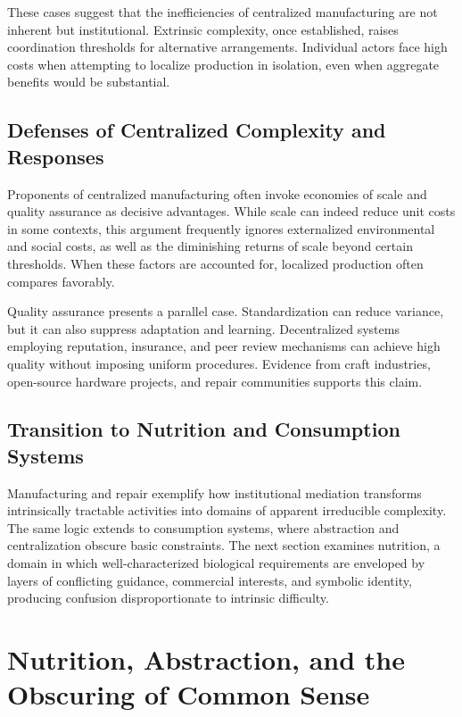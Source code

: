 \documentclass[11pt]{article}
\begin{document}
These cases suggest that the inefficiencies of centralized manufacturing are not inherent but institutional. Extrinsic complexity, once established, raises coordination thresholds for alternative arrangements. Individual actors face high costs when attempting to localize production in isolation, even when aggregate benefits would be substantial.

\subsection{Defenses of Centralized Complexity and Responses}

Proponents of centralized manufacturing often invoke economies of scale and quality assurance as decisive advantages. While scale can indeed reduce unit costs in some contexts, this argument frequently ignores externalized environmental and social costs, as well as the diminishing returns of scale beyond certain thresholds. When these factors are accounted for, localized production often compares favorably.

Quality assurance presents a parallel case. Standardization can reduce variance, but it can also suppress adaptation and learning. Decentralized systems employing reputation, insurance, and peer review mechanisms can achieve high quality without imposing uniform procedures. Evidence from craft industries, open-source hardware projects, and repair communities supports this claim.

\subsection{Transition to Nutrition and Consumption Systems}

Manufacturing and repair exemplify how institutional mediation transforms intrinsically tractable activities into domains of apparent irreducible complexity. The same logic extends to consumption systems, where abstraction and centralization obscure basic constraints. The next section examines nutrition, a domain in which well-characterized biological requirements are enveloped by layers of conflicting guidance, commercial interests, and symbolic identity, producing confusion disproportionate to intrinsic difficulty.

\section{Nutrition, Abstraction, and the Obscuring of Common Sense}
\end{document}
